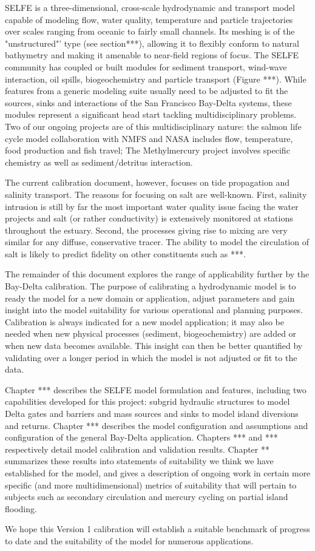 SELFE is a three-dimensional, cross-scale hydrodynamic and transport model capable of modeling flow, water quality, 
temperature and particle trajectories over scales ranging from oceanic to fairly small channels. 
Its meshing is of the "unstructured"' type (see section***), allowing it to flexibly conform 
to natural bathymetry and making it amenable to near-field regions of focus. The SELFE 
community has coupled or built modules for sediment transport, wind-wave 
interaction, oil spills, biogeochemistry and particle transport (Figure ***). While features from a generic modeling suite usually
need to be adjusted to fit the sources, sinks and interactions of the San Francisco Bay-Delta systems, 
these modules represent a significant head start tackling multidisciplinary problems.  
Two of our ongoing projects are of this multidisciplinary nature: 
the salmon life cycle model collaboration with NMFS and NASA includes flow, temperature, food production and fish travel; 
The Methylmercury project involves specific chemistry as well as sediment/detritus interaction. 

The current calibration document, however, focuses on tide propagation and salinity transport. The reasons for focusing on salt are well-known. 
First, salinity intrusion is still by far the most important water quality issue facing the water projects and salt (or rather conductivity) 
is extensively monitored at stations throughout the estuary. Second, the processes giving rise to mixing are very similar 
for any diffuse, conservative tracer. The ability to model the circulation of salt is likely to predict fidelity on other constituents such as  ***. 

The remainder of this document explores the range of applicability further by the Bay-Delta calibration. The purpose of calibrating a 
hydrodynamic model is to ready the model for a new domain or application, adjust parameters and gain insight
into the model suitability for various operational and planning purposes. Calibration is always indicated for a new model application; 
it may also be needed when new physical processes (sediment, biogeochemistry) are added or when new data becomes available. 
This insight can then be better quantified by validating over a longer period in which the model is not adjusted or fit to the data. 

Chapter  *** describes the SELFE model formulation and features, including two capabilities developed for this project: 
subgrid hydraulic structures to model Delta gates and barriers and mass sources and sinks to model island diversions and returns. 
Chapter *** describes the model configuration and assumptions and configuration of the general Bay-Delta application. Chapters *** and *** respectively detail model calibration and validation results. Chapter ** summarizes these results into statements of suitability we think we have
established for the model, and gives a description of ongoing work in certain more specific (and more multidimensional) metrics of suitability that will pertain to subjects such as secondary circulation and mercury cycling on partial island flooding.

We hope this Version 1 calibration will establish a suitable benchmark of progress to date and the suitability of the model for numerous applications.



 
